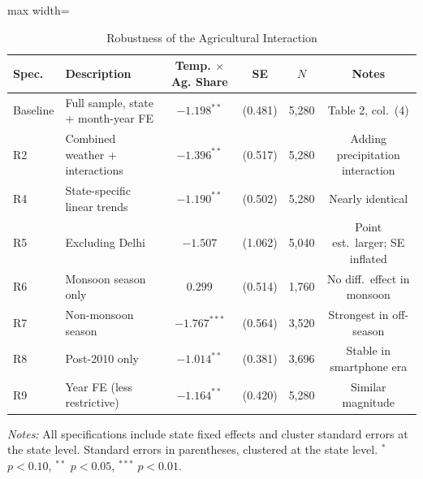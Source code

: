 \documentclass[12pt]{article}
\begin{document}
\begin{table}[H]
\centering
\caption{Robustness of the Agricultural Interaction}
\label{tab:robustness}
\begin{adjustbox}{max width=\textwidth}
\begin{threeparttable}
\begin{tabular}{llcccc}
\toprule
Spec. & Description & Temp. $\times$ Ag. Share & SE & $N$ & Notes \\
\midrule
Baseline & Full sample, state + month-year FE & $-1.198^{**}$ & (0.481) & 5,280 & Table 2, col.~(4) \\
R2 & Combined weather + interactions & $-1.396^{**}$ & (0.517) & 5,280 & Adding precipitation interaction \\
R4 & State-specific linear trends & $-1.190^{**}$ & (0.502) & 5,280 & Nearly identical \\
R5 & Excluding Delhi & $-1.507$ & (1.062) & 5,040 & Point est.\ larger; SE inflated \\
R6 & Monsoon season only & $0.299$ & (0.514) & 1,760 & No diff.\ effect in monsoon \\
R7 & Non-monsoon season & $-1.767^{***}$ & (0.564) & 3,520 & Strongest in off-season \\
R8 & Post-2010 only & $-1.014^{**}$ & (0.381) & 3,696 & Stable in smartphone era \\
R9 & Year FE (less restrictive) & $-1.164^{**}$ & (0.420) & 5,280 & Similar magnitude \\
\bottomrule
\end{tabular}
\begin{tablenotes}[flushleft]
\small
\item \textit{Notes:} All specifications include state fixed effects and cluster standard errors at the state level. Standard errors in parentheses, clustered at the state level. $^{*}$ $p<0.10$, $^{**}$ $p<0.05$, $^{***}$ $p<0.01$.
\end{tablenotes}
\end{threeparttable}
\end{adjustbox}
\end{table}
\end{document}
